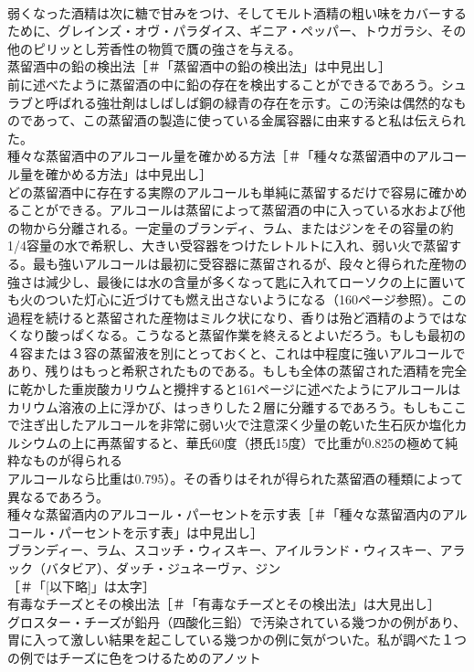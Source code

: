 \documentclass[8pt]{extreport}
\begin{document}
\begin{CJK}{UTF8}{min}
\\	弱くなった酒精は次に糖で甘みをつけ、そしてモルト酒精の粗い味をカバーするために、グレインズ・オヴ・パラダイス、ギニア・ペッパー、トウガラシ、その他のピリッとし芳香性の物質で贋の強さを与える。
\\	蒸留酒中の鉛の検出法［＃「蒸留酒中の鉛の検出法」は中見出し］
\\	前に述べたように蒸留酒の中に鉛の存在を検出することができるであろう。シュラブと呼ばれる強壮剤はしばしば銅の緑青の存在を示す。この汚染は偶然的なものであって、この蒸留酒の製造に使っている金属容器に由来すると私は伝えられた。
\\	種々な蒸留酒中のアルコール量を確かめる方法［＃「種々な蒸留酒中のアルコール量を確かめる方法」は中見出し］
\\	どの蒸留酒中に存在する実際のアルコールも単純に蒸留するだけで容易に確かめることができる。アルコールは蒸留によって蒸留酒の中に入っている水および他の物から分離される。一定量のブランディ、ラム、またはジンをその容量の約1/4容量の水で希釈し、大きい受容器をつけたレトルトに入れ、弱い火で蒸留する。最も強いアルコールは最初に受容器に蒸留されるが、段々と得られた産物の強さは減少し、最後には水の含量が多くなって匙に入れてローソクの上に置いても火のついた灯心に近づけても燃え出さないようになる（160ページ参照）。この過程を続けると蒸留された産物はミルク状になり、香りは殆ど酒精のようではなくなり酸っぱくなる。こうなると蒸留作業を終えるとよいだろう。もしも最初の４容または３容の蒸留液を別にとっておくと、これは中程度に強いアルコールであり、残りはもっと希釈されたものである。もしも全体の蒸留された酒精を完全に乾かした重炭酸カリウムと攪拌すると161ページに述べたようにアルコールはカリウム溶液の上に浮かび、はっきりした２層に分離するであろう。もしもここで注ぎ出したアルコールを非常に弱い火で注意深く少量の乾いた生石灰か塩化カルシウムの上に再蒸留すると、華氏60度（摂氏15度）で比重が0.825の極めて純粋なものが得られる
\\	アルコールなら比重は0.795）。その香りはそれが得られた蒸留酒の種類によって異なるであろう。
\\	種々な蒸留酒内のアルコール・パーセントを示す表［＃「種々な蒸留酒内のアルコール・パーセントを示す表」は中見出し］
\\	ブランディー、ラム、スコッチ・ウィスキー、アイルランド・ウィスキー、アラック（バタビア）、ダッチ・ジュネーヴァ、ジン
\\	[以下略]［＃「[以下略]」は太字］
\\	有毒なチーズとその検出法［＃「有毒なチーズとその検出法」は大見出し］
\\	グロスター・チーズが鉛丹（四酸化三鉛）で汚染されている幾つかの例があり、胃に入って激しい結果を起こしている幾つかの例に気がついた。私が調べた１つの例ではチーズに色をつけるためのアノット

\end{CJK}
\end{document}
